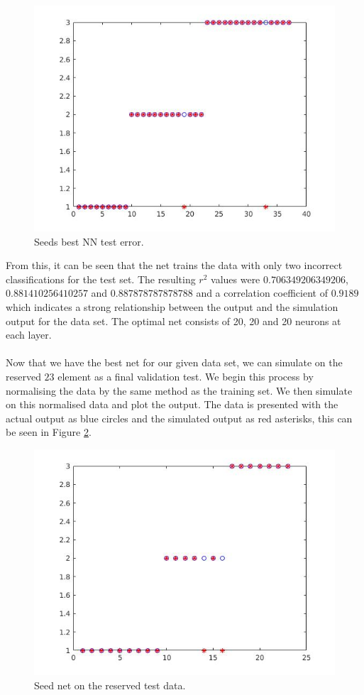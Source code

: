 \documentclass{article}%
\begin{document}
\begin{figure}[H]
\centering
\includegraphics[scale=0.5]{Images/seedtrain.jpg}
\caption{Seeds best NN test error.}
\label{fig:seedtrain}
\end{figure}
From this, it can be seen that the net trains the data with only two incorrect classifications for the test set. The resulting $r^2$ values were $0.706349206349206$, $0.881410256410257$ and $0.887878787878788$ and a correlation coefficient of $0.9189$ which indicates a strong relationship between the output and the simulation output for the data set. The optimal net consists of 20, 20 and 20 neurons at each layer.
\\
\\
Now that we have the best net for our given data set, we can simulate on the reserved $23$ element as a final validation test. We begin this process by normalising the data by the same method as the training set. We then simulate on this normalised data and plot the output. The data is presented with the actual output as blue circles and the simulated output as red asterisks, this can be seen in Figure \ref{fig:seedtest}.
\begin{figure}[H]
\centering
\includegraphics[scale=0.5]{Images/seedtest.jpg}
\caption{Seed net on the reserved test data.}
\label{fig:seedtest}
\end{figure}
\end{document}
